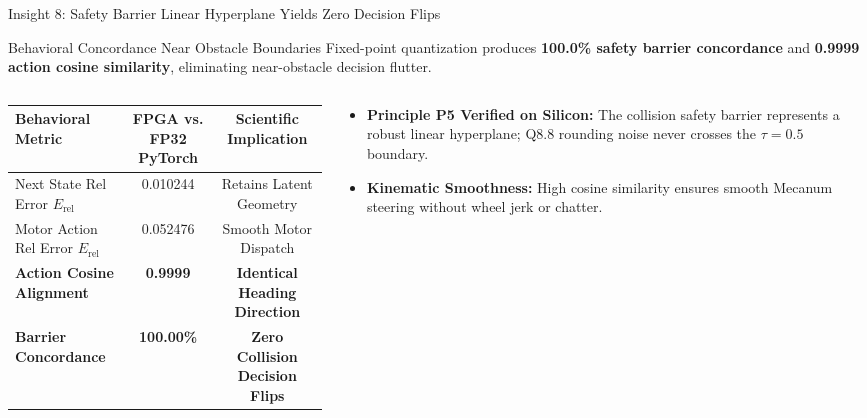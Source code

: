 \documentclass[aspectratio=169, 10pt]{beamer}
\begin{document}
\begin{frame}{Insight 8: Safety Barrier Linear Hyperplane Yields Zero Decision Flips}
  \begin{block}{Behavioral Concordance Near Obstacle Boundaries}
    Fixed-point quantization produces \textbf{100.0\% safety barrier concordance} and \textbf{0.9999 action cosine similarity}, eliminating near-obstacle decision flutter.
  \end{block}
  \vspace{-0.2cm}
  \begin{columns}[T]
    \begin{column}{0.52\textwidth}
      \setlength{\tabcolsep}{3pt}
      \begin{table}
        \centering
        \scriptsize
        \begin{tabular}{lcc}
          \toprule
          \textbf{Behavioral Metric} & \textbf{FPGA vs. FP32 PyTorch} & \textbf{Scientific Implication} \\
          \midrule
          Next State Rel Error $E_{\text{rel}}$ & 0.010244 & Retains Latent Geometry \\
          Motor Action Rel Error $E_{\text{rel}}$ & 0.052476 & Smooth Motor Dispatch \\
          \textbf{Action Cosine Alignment} & \textbf{0.9999} & \textbf{Identical Heading Direction} \\
          \textbf{Barrier Concordance} & \textbf{100.00\%} & \textbf{Zero Collision Decision Flips} \\
          \bottomrule
        \end{tabular}
      \end{table}
    \end{column}
    \begin{column}{0.46\textwidth}
      \begin{itemize}
        \item \textbf{Principle P5 Verified on Silicon:} The collision safety barrier represents a robust linear hyperplane; Q8.8 rounding noise never crosses the $\tau = 0.5$ boundary.
        \item \textbf{Kinematic Smoothness:} High cosine similarity ensures smooth Mecanum steering without wheel jerk or chatter.
      \end{itemize}
    \end{column}
  \end{columns}
\end{frame}
\end{document}
